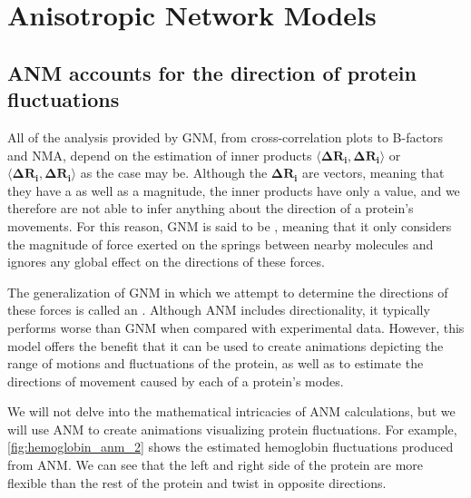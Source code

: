\FloatBarrier
{}
\section{Anisotropic Network Models}

\FloatBarrier
{}
\subsection{ANM accounts for the direction of protein fluctuations}

All of the analysis provided by GNM, from cross-correlation plots to B-factors and NMA, depend on the estimation of inner products $ \langle \mathbf{\Delta R_i}, \mathbf{\Delta R_i} \rangle $ or $ \langle \mathbf{\Delta R_i}, \mathbf{\Delta R_i} \rangle $ as the case may be. Although the $ \mathbf{\Delta R_i} $ are vectors, meaning that they have a  as well as a magnitude, the inner products have only a value, and we therefore are not able to infer anything about the direction of a protein's movements. For this reason, GNM is said to be , meaning that it only considers the magnitude of force exerted on the springs between nearby molecules and ignores any global effect on the directions of these forces.

The generalization of GNM in which we attempt to determine the directions of these forces is called an . Although ANM includes directionality, it typically performs worse than GNM when compared with experimental data. However, this model offers the benefit that it can be used to create animations depicting the range of motions and fluctuations of the protein, as well as to estimate the directions of movement caused by each of a protein's modes.

We will not delve into the mathematical intricacies of ANM calculations, but we will use ANM to create animations visualizing protein fluctuations. For example, \autoref{fig:hemoglobin_anm_2} shows the estimated hemoglobin fluctuations produced from ANM. We can see that the left and right side of the protein are more flexible than the rest of the protein and twist in opposite directions.\\

